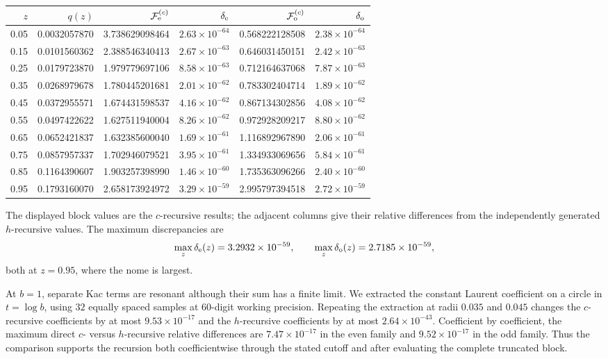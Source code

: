 \documentclass[11pt]{article}
\newcommand{\F}{\mathcal F}
\begin{document}
\begin{center}
\scriptsize
\begin{tabular}{@{}rrrrrr@{}}
\toprule
\(z\) & \(q(z)\) & \(\F_{\rm e}^{(c)}\) & \(\delta_{\rm e}\)
      & \(\F_{\rm o}^{(c)}\) & \(\delta_{\rm o}\)\\
\midrule
0.05 & 0.0032057870 & 3.738629098464 & \(2.63\times10^{-64}\)
     & 0.568222128508 & \(2.38\times10^{-64}\)\\
0.15 & 0.0101560362 & 2.388546340413 & \(2.67\times10^{-63}\)
     & 0.646031450151 & \(2.42\times10^{-63}\)\\
0.25 & 0.0179723870 & 1.979779697106 & \(8.58\times10^{-63}\)
     & 0.712164637068 & \(7.87\times10^{-63}\)\\
0.35 & 0.0268979678 & 1.780445201681 & \(2.01\times10^{-62}\)
     & 0.783302404714 & \(1.89\times10^{-62}\)\\
0.45 & 0.0372955571 & 1.674431598537 & \(4.16\times10^{-62}\)
     & 0.867134302856 & \(4.08\times10^{-62}\)\\
0.55 & 0.0497422622 & 1.627511940004 & \(8.26\times10^{-62}\)
     & 0.972928209217 & \(8.80\times10^{-62}\)\\
0.65 & 0.0652421837 & 1.632385600040 & \(1.69\times10^{-61}\)
     & 1.116892967890 & \(2.06\times10^{-61}\)\\
0.75 & 0.0857957337 & 1.702946079521 & \(3.95\times10^{-61}\)
     & 1.334933069656 & \(5.84\times10^{-61}\)\\
0.85 & 0.1164390607 & 1.903257398990 & \(1.46\times10^{-60}\)
     & 1.735363096266 & \(2.40\times10^{-60}\)\\
0.95 & 0.1793160070 & 2.658173924972 & \(3.29\times10^{-59}\)
     & 2.995797394518 & \(2.72\times10^{-59}\)\\
\bottomrule
\end{tabular}
\end{center}
The displayed block values are the \(c\)-recursive results; the adjacent
columns give their relative differences from the independently generated
\(h\)-recursive values.  The maximum discrepancies are
\begin{equation}
 \max_z\delta_{\rm e}(z)=3.2932\times10^{-59},
 \qquad
 \max_z\delta_{\rm o}(z)=2.7185\times10^{-59},
 \label{eq:sphere-c-h-order-ten-result}
\end{equation}
both at \(z=0.95\), where the nome is largest.

At \(b=1\), separate Kac terms are resonant although their sum has a finite
limit.  We extracted the constant Laurent coefficient on a circle in
\(t=\log b\), using \(32\) equally spaced samples at \(60\)-digit working
precision.  Repeating the extraction at radii \(0.035\) and \(0.045\)
changes the \(c\)-recursive coefficients by at most
\(9.53\times10^{-17}\) and the \(h\)-recursive coefficients by at most
\(2.64\times10^{-43}\).  Coefficient by coefficient, the maximum direct
\(c\)- versus \(h\)-recursive relative differences are
\(7.47\times10^{-17}\) in the even family and
\(9.52\times10^{-17}\) in the odd family.  Thus the comparison supports the
recursion both coefficientwise through the stated cutoff and after evaluating
the complete truncated block.
\end{document}
